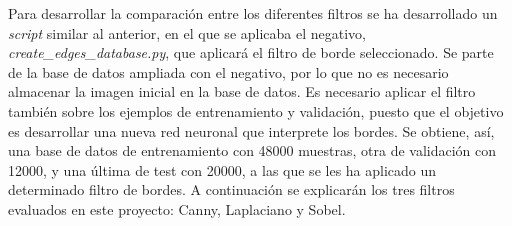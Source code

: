 Para desarrollar la comparación entre los diferentes filtros se ha desarrollado un \textit{script} similar al anterior, en el que se aplicaba el negativo, \textit{create\_edges\_database.py}, que aplicará el filtro de borde seleccionado. Se parte de la base de datos ampliada con el negativo, por lo que no es necesario almacenar la imagen inicial en la base de datos. Es necesario aplicar el filtro también sobre los ejemplos de entrenamiento y validación, puesto que el objetivo es desarrollar una nueva red neuronal que interprete los bordes. Se obtiene, así, una base de datos de entrenamiento con 48000 muestras, otra de validación con 12000, y una última de test con 20000, a las que se les ha aplicado un determinado filtro de bordes. A continuación se explicarán los tres filtros evaluados en este proyecto: Canny, Laplaciano y Sobel.
\vspace{10pt}
